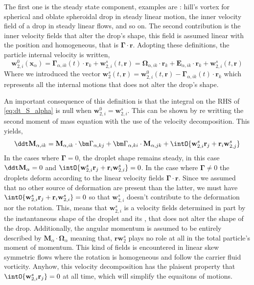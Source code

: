 The first one is the steady state component, examples are : hill's vortex for spherical and oblate spheroidal drop in steady linear motion, the inner velocity field of a drop in steady linear flows, and so on. 
The second contribution is the inner velocity fields that alter the drop's shape, this field is assumed linear with the position and homogeneous, that is $\bm\Gamma\cdot \textbf{r}$. 
Adopting these definitions, the particle internal velocity is written, 
\begin{equation}
    \textbf{w}_{2,i}^0(\textbf{x}_\alpha)
    = \bm\Gamma_{\alpha,ik}(t) \cdot \textbf{r}_k
    + \textbf{w}^{s}_{2,i}(t,\textbf{r})
    =\bm{\Omega}_{\alpha,ik}\cdot \textbf{r}_k
    + \textbf{E}_{\alpha,ik} \cdot \textbf{r}_k
    + \textbf{w}^{s}_{2,i}(t,\textbf{r})
    \label{eq:def_vel}
\end{equation}
Where we introduced the vector $\textbf{w}^{s}_2(t,\textbf{r}) =\textbf{w}^{0}_{2,i}(t,\textbf{r})  - \bm\Gamma_{\alpha,ik}(t) \cdot \textbf{r}_k$ which represents all the internal motions that does not alter the drop's shape. 

An important consequence of this definition is that the integral on the RHS of \ref{eq:dt_S_alpha} is null when $\textbf{w}_{2,i}^0 = \textbf{w}_{2,i}^s$. 
This can be shown by re writting the second moment of mass equation with the use of the velocity decomposition.
This yields,
\begin{equation*}
    \ddt \textbf{M}_{\alpha,ik}
    = 
    \textbf{M}_{\alpha,ik} \cdot \bm\Gamma_{\alpha,kj}
    +  \bm\Gamma_{\alpha,ki} \cdot \textbf{M}_{\alpha,jk}
    +
    \intO{ 
        \textbf{w}_{2,i}^s\textbf{r}_j
        + \textbf{r}_i\textbf{w}_{2,j}^s
    }
\end{equation*}
In the cases where $\bm\Gamma = 0$, the droplet shape remains steady, in this case $\ddt \textbf{M}_\alpha = 0$ and $\intO{\textbf{w}^{s}_{2,i} \textbf{r}_j + \textbf{r}_i \textbf{w}_{2,i}^s} = 0$. 
In the case where $\bm\Gamma \neq 0$ the droplets deform according to the linear velocity fields $\bm\Gamma\cdot \textbf{r}$.
Since we assumed that no other source of deformation are present than the latter, we must have $\intO{\textbf{w}^{s}_{2,i} \textbf{r}_j + \textbf{r}_i \textbf{w}_{2,i}^s} = 0$ so that $\textbf{w}^{s}_{2,i} $ doesn't contribute to the deformation nor the rotation.
This, means that $\textbf{w}^{s}_{2,i}$ is a velocity fields determined in  part by the instantaneous shape of the droplet and its , that does not alter the shape of the drop. 
Additionally, the angular momentum is assumed to be entirely described by $\textbf{M}_\alpha \cdot \bm\Omega_\alpha$ meaning that, $\textbf{r} \textbf{w}_{2}^s$ plays no role at all in the total particle's moment of momentum.
This kind of fields is encountered in linear skew symmetric flows where the rotation is homogeneous and follow the carrier fluid vorticity. 
Anyhow, this velocity decomposition has the plaisent property that $\intO{\textbf{w}^{s}_{2,i} \textbf{r}_j} = 0$ at all time, which will simplify the equaitons of motions. 

